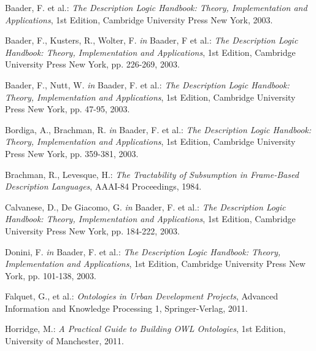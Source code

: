 \documentclass[titlepage,a4paper,12pt,oneside]{book}
\begin{document}
\begin{thebibliography}{99}

  Baader, F. et al.: 
  \textit{The Description Logic Handbook: Theory, Implementation and Applications},
  1st Edition,
  Cambridge University Press New York,
  2003.

  Baader, F., Kusters, R., Wolter, F. \textit{in} Baader, F et al.:
  \textit{The Description Logic Handbook: Theory, Implementation and Applications},
  1st Edition,
  Cambridge University Press New York,
  pp. 226-269,
  2003.

  Baader, F., Nutt, W. \textit{in} Baader, F. et al.:
  \textit{The Description Logic Handbook: Theory, Implementation and Applications},
  1st Edition,
  Cambridge University Press New York,
  pp. 47-95,
  2003.

  Bordiga, A., Brachman, R. \textit{in} Baader, F. et al.:
  \textit{The Description Logic Handbook: Theory, Implementation and Applications},
  1st Edition,
  Cambridge University Press New York,
  pp. 359-381,
  2003.
  
  Brachman, R., Levesque, H.:
  \textit{The Tractability of Subsumption in Frame-Based Description Languages},
  AAAI-84 Proceedings,
  1984.

  Calvanese, D., De Giacomo, G. \textit{in} Baader, F. et al.:
  \textit{The Description Logic Handbook: Theory, Implementation and Applications},
  1st Edition,
  Cambridge University Press New York,
  pp. 184-222,
  2003.

  Donini, F. \textit{in} Baader, F. et al.:
  \textit{The Description Logic Handbook: Theory, Implementation and Applications},
  1st Edition,
  Cambridge University Press New York,
  pp. 101-138,
  2003.

  Falquet, G., et al.:
  \textit{Ontologies in Urban Development Projects},
  Advanced Information and Knowledge Processing 1,
  Springer-Verlag,
  2011.

  Horridge, M.: 
  \textit{A Practical Guide to Building OWL Ontologies},
  1st Edition,
  University of Manchester, 2011.


\end{thebibliography}
\end{document}
